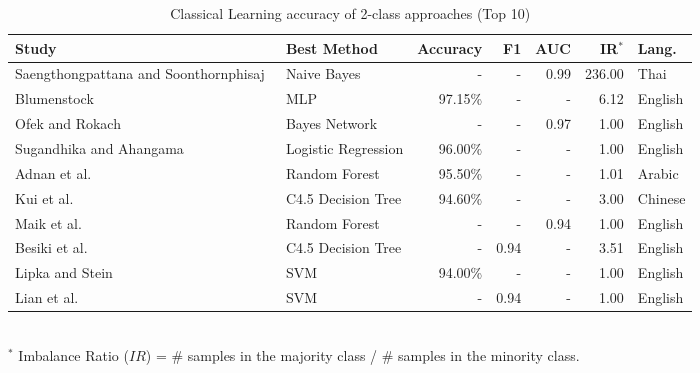 \begin{table}[ht]
    \caption{Classical Learning accuracy of 2-class approaches (Top 10)}
    \label{tab:CL_performance_2class}
    \centering
    \begin{tabular}{m{} l r r r r l}
        \toprule
        \textbf{Study} & \textbf{Best Method} & \textbf{Accuracy} & \textbf{F1} & \textbf{AUC} & \textbf{IR$^*$} & \textbf{Lang.} \\ 
        \midrule
        Saengthongpattana and Soonthornphisaj~\cite{Saengthongpattana2014_lr169} & Naive Bayes & - & - & 0.99 & 236.00 & Thai \\
        Blumenstock~\cite{Blumenstock2008_lr4} & MLP & 97.15\% & - & - & 6.12 & English \\
        Ofek and Rokach~\cite{Ofek2015_lr1010} & Bayes Network & - & - & 0.97 & 1.00 & English \\
        Sugandhika and Ahangama~\cite{Sugandhika2022_lr119} & Logistic Regression & 96.00\% & - & - & 1.00 & English \\
        Adnan et al.~\cite{Yahya2020_lr2011} & Random Forest & 95.50\% & - & - & 1.01 & Arabic \\
        Kui et al.~\cite{Xiao2013_lr2030} & C4.5 Decision Tree & 94.60\% & - & - & 3.00 & Chinese \\
        Maik et al.~\cite{Anderka2011_lr35} & Random Forest & - & - & 0.94 & 1.00 & English \\
        Besiki et al.~\cite{Stvilia2005_lr1013} & C4.5 Decision Tree & - & 0.94 & - & 3.51 & English \\
        Lipka and Stein~\cite{Lipka2010_lr1019} & SVM & 94.00\% & - & - & 1.00 & English \\
        Lian et al.~\cite{Pohn2014_lr1040} & SVM & - & 0.94 & - & 1.00 & English \\
        \bottomrule
    \end{tabular}
    \\ \vspace{0.1cm}
    \footnotesize
    $^*$ Imbalance Ratio ($IR$) = \# samples in the majority class / \# samples in the minority class. 
\end{table}